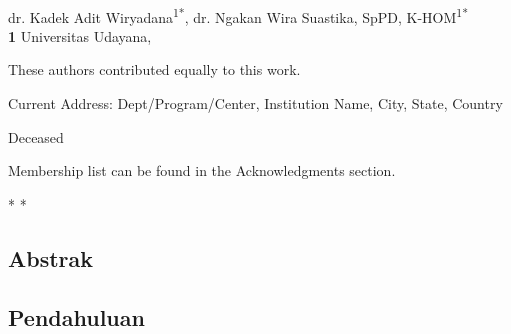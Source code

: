 \documentclass[
  10pt,
  letterpaper,
]{article}
\begin{document}
\vspace*{0.2in}

\begin{flushleft}
{\Large
\textbf{} %
}
\newline
\\
dr. Kadek Adit Wiryadana\textsuperscript{1*}, dr. Ngakan Wira Suastika,
SpPD, K-HOM\textsuperscript{1*}
\\
\bigskip
\textbf{1} Universitas Udayana, 
\bigskip

% 
%
\Yinyang These authors contributed equally to this work.


\textcurrency Current Address: Dept/Program/Center, Institution Name, City, State, Country %

\dag Deceased

\textpilcrow Membership list can be found in the Acknowledgments section.

* 
* 

\end{flushleft}



\linenumbers
\subsection{Abstrak}\label{abstrak}

\subsection{Pendahuluan}\label{pendahuluan}
\end{document}
